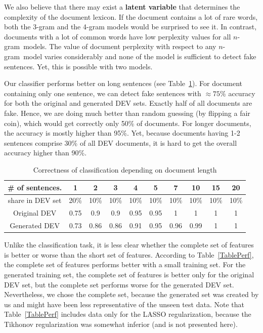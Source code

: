 \documentclass[11pt]{article}
\newcommand{\ngram}{\mbox{$n$-gram }}
\newcommand{\leocomment}[1]{\todo[color=red!40,caption={Leo's comment}]{#1}}
\begin{document}
We also believe that there may exist a \textbf{latent variable} that determines the complexity
of the document lexicon.
If the document contains a lot of rare words, both the 3-gram and the 4-gram models
would be surprised to see it. In contrast, documents with a lot of common words
have low perplexity values for all \ngram models.
The value of document perplexity with respect to any \ngram model varies considerably
and none of the model is sufficient to detect fake sentences.
Yet, this is possible with two models.

Our classifier performs better on long sentences (see Table~\ref{TableCorr}).
For document containing only one sentence, we can detect fake sentences with $\approx 75\%$ accuracy
for both the original and generated DEV sets.
Exactly half of all documents are fake. Hence, we are doing much 
better than random guessing (by flipping a fair coin), which would get correctly only 50\% of documents.\leocomment{Guys, do you agree with this estimate?}
For longer documents, the accuracy is mostly higher than 95\%.
Yet, because documents having 1-2 sentences comprise 30\% of all DEV documents,
it is hard to get the overall accuracy higher than 90\%.

\begin{table}\centering
\caption{Correctness of classification depending on document length\label{TableCorr}}
\begin{tabular}{c|c|c|c|c|c|c|c|c|c}
\# of sentences.  &  1   &  2   &   3   &  4   &   5   &    7  & 10   & 15   &  20  \\\hline
share in DEV set  & 20\% & 10\% &  10\% & 10\% &  10\% &  10\% & 10\% & 10\% & 10\%  \\\hline\hline
Original DEV      & 0.75 & 0.9  &  0.9  & 0.95 & 0.95  &    1  &   1  &   1  &  1 \\\hline
Generated DEV     & 0.73 & 0.86 &  0.86 & 0.91 & 0.95  &   0.96&  0.99 &  1  &  1 \\\hline
\end{tabular}
\end{table}

Unlike the classification task, it is less clear whether the complete set of features is better or worse 
than the short set of features. 
According to Table~\ref{TablePerf}, the complete set of features performs better with a small training set.
For the generated training set, the complete set of features is better only for the original DEV set,
but the complete set performs worse for the generated DEV set.
Nevertheless, we chose the complete set, 
because the generated set was created by us and might have been less representative of the unseen test data.
Note that Table~\ref{TablePerf} includes data only for the LASSO
regularization, because the Tikhonov regularization was somewhat inferior (and is not presented here).
\end{document}

